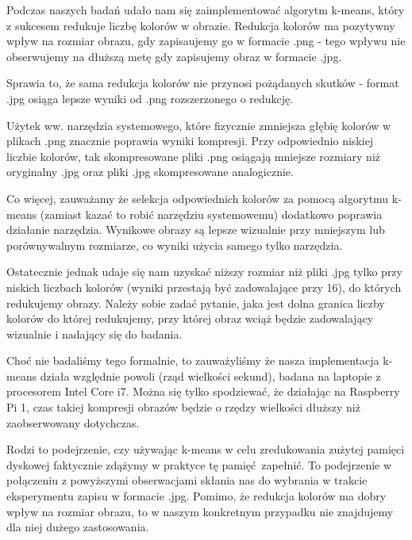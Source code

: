 Podczas naszych badań udało nam się zaimplementować algorytm k-means, który z sukcesem redukuje liczbę kolorów w obrazie. Redukcja kolorów ma pozytywny wpływ na rozmiar obrazu, gdy zapisaujemy go w formacie .png - tego wpływu nie obserwujemy na dłuższą metę gdy zapisujemy obraz w formacie .jpg.

Sprawia to, że sama redukcja kolorów nie przynosi pożądanych skutków - format .jpg osiąga lepsze wyniki od .png rozszerzonego o redukcję.

Użytek ww. narzędzia systemowego, które fizycznie zmniejsza głębię kolorów w plikach .png znacznie poprawia wyniki kompresji. Przy odpowiednio niskiej liczbie kolorów, tak skompresowane pliki .png osiągają mniejsze rozmiary niż oryginalny .jpg oraz pliki .jpg skompresowane analogicznie.

Co więcej, zauważamy że selekcja odpowiednich kolorów za pomocą algorytmu k-means (zamiast kazać to robić narzędziu systemowemu) dodatkowo poprawia działanie narzędzia. Wynikowe obrazy są lepsze wizualnie przy mniejszym lub porównywalnym rozmiarze, co wyniki użycia samego tylko narzędzia.

Ostatecznie jednak udaje się nam uzyskać niższy rozmiar niż pliki .jpg tylko przy niskich liczbach kolorów (wyniki przestają być zadowalające przy 16), do których redukujemy obrazy. Należy sobie zadać pytanie, jaka jest dolna granica liczby kolorów do której redukujemy, przy której obraz wciąż będzie zadowalający wizualnie i nadający się do badania.

Choć nie badaliśmy tego formalnie, to zauważyliśmy że nasza implementacja k-means działa względnie powoli (rząd wielkości sekund), badana na laptopie z procesorem Intel Core i7. Można się tylko spodziewać, że działając na Raspberry Pi 1, czas takiej kompresji obrazów będzie o rzędzy wielkości dłuższy niż zaobserwowany dotychczas.

Rodzi to podejrzenie, czy używając k-means w celu zredukowania zużytej pamięci dyskowej faktycznie zdążymy w praktyce tę pamięć zapełnić. To podejrzenie w połączeniu z powyższymi obserwacjami skłania nas do wybrania w trakcie eksperymentu zapisu w formacie .jpg. Pomimo, że redukcja kolorów ma dobry wpływ na rozmiar obrazu, to w naszym konkretnym przypadku nie znajdujemy dla niej dużego zastosowania.
